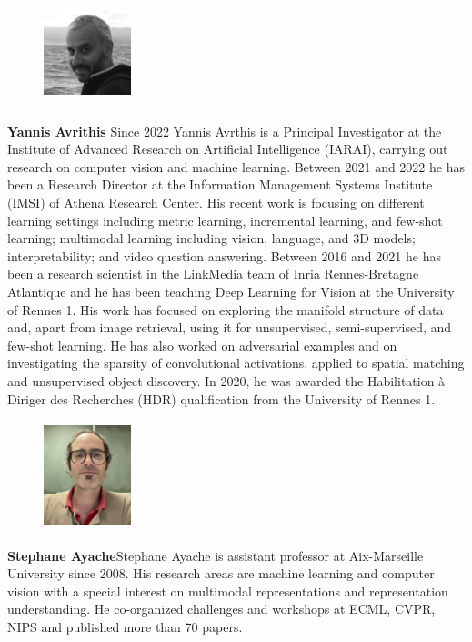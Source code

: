\documentclass{article}
\begin{document}
\begin{figure}
\includegraphics[width=1in,height=1.25in,clip,keepaspectratio]{author/iavr.jpg}
\end{figure}\par
\textbf{Yannis Avrithis} Since 2022 Yannis Avrthis is a Principal Investigator at the Institute of Advanced Research on Artificial Intelligence (IARAI), carrying out research on computer vision and machine learning. Between 2021 and 2022 he has been a Research Director at the Information Management Systems Institute (IMSI) of Athena Research Center. His recent work is focusing on different learning settings including metric learning, incremental learning, and few-shot learning; multimodal learning including vision, language, and 3D models; interpretability; and video question answering.
Between 2016 and 2021 he has been a research scientist in the LinkMedia team of Inria Rennes-Bretagne Atlantique and he has been teaching Deep Learning for Vision at the University of Rennes 1. His work has focused on exploring the manifold structure of data and, apart from image retrieval, using it for unsupervised, semi-supervised, and few-shot learning. He has also worked on adversarial examples and on investigating the sparsity of convolutional activations, applied to spatial matching and unsupervised object discovery. In 2020, he was awarded the Habilitation à Diriger des Recherches (HDR) qualification from the University of Rennes 1.\par

\begin{figure}
\includegraphics[width=1in,height=1.25in,clip,keepaspectratio]{author/SA.png}
\end{figure}\par
\textbf{Stephane Ayache}Stephane Ayache is assistant professor at Aix-Marseille University since 2008. His research areas are machine learning and computer vision with a special interest on multimodal representations and representation understanding. He co-organized challenges and workshops at ECML, CVPR, NIPS and published more than 70 papers.\par
\end{document}
